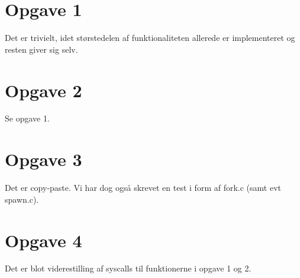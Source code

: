 



\maketitle

\tableofcontents

\thispagestyle{empty}

\section{Opgave 1}
Det er trivielt, idet størstedelen af funktionaliteten allerede er implementeret
og resten giver sig selv.

\section{Opgave 2}
Se opgave 1.

\section{Opgave 3}
Det er copy-paste. Vi har dog også skrevet en test i form af fork.c (samt evt
spawn.c).

\section{Opgave 4}
Det er blot viderestilling af syscalls til funktionerne i opgave 1 og 2.


